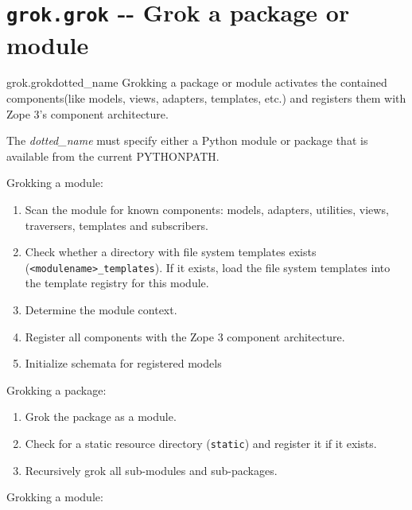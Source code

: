 \documentclass[10pt,a4paper,english]{manual}
\newcommand{\titlereference}[1]{\textsl{#1}}
\begin{document}
\section{\texttt{grok.grok} -{}- Grok a package or module}
\begin{funcdesc}{grok.grok}{dotted{\_}name}
Grokking a package or module activates the contained
components(like models, views, adapters, templates, etc.) and
registers them with Zope 3's component architecture.

The \titlereference{dotted{\_}name} must specify either a Python module or package
that is available from the current PYTHONPATH.

Grokking a module:
\begin{enumerate}
\item { 
Scan the module for known components: models, adapters, utilities, views,
traversers, templates and subscribers.
}

\item { 
Check whether a directory with file system templates exists
(\texttt{<modulename>{\_}templates}).  If it exists, load the file
system templates into the template registry for this module.
}

\item { 
Determine the module context.
}

\item { 
Register all components with the Zope 3 component architecture.
}

\item { 
Initialize schemata for registered models
}

\end{enumerate}

Grokking a package:
\begin{enumerate}
\item { 
Grok the package as a module.
}

\item { 
Check for a static resource directory (\texttt{static}) and
register it if it exists.
}

\item { 
Recursively grok all sub-modules and sub-packages.
}

\end{enumerate}
\end{funcdesc}
Grokking a module:
\end{document}
